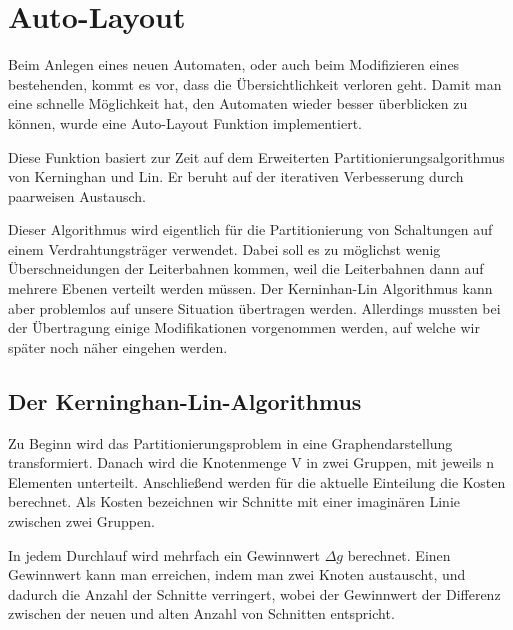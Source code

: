 



\chapter{Auto-Layout}\label{AutoLayout}

Beim Anlegen eines neuen Automaten, oder auch beim Modifizieren eines
bestehenden, kommt es vor, dass die Übersichtlichkeit verloren geht. Damit man
eine schnelle Möglichkeit hat, den Automaten wieder besser überblicken zu
können, wurde eine Auto-Layout Funktion implementiert.\vspace{10pt}

Diese Funktion basiert zur Zeit auf dem Erweiterten Partitionierungsalgorithmus
von Kerninghan und Lin. Er beruht auf der iterativen Verbesserung durch
paarweisen Austausch.\vspace{10pt}

Dieser Algorithmus wird eigentlich für die Partitionierung von Schaltungen auf
einem Verdrahtungsträger verwendet. Dabei soll es zu möglichst wenig
Überschneidungen der Leiterbahnen kommen, weil die Leiterbahnen dann auf mehrere
Ebenen verteilt werden müssen. Der Kerninhan-Lin Algorithmus kann aber problemlos
auf unsere Situation übertragen werden. Allerdings mussten bei der Übertragung
einige Modifikationen vorgenommen werden, auf welche wir später noch näher
eingehen werden.\vspace{10pt}

\section{Der Kerninghan-Lin-Algorithmus}\label{KerninghanLin}

Zu Beginn wird das Partitionierungsproblem in eine Graphendarstellung
transformiert. Danach wird die Knotenmenge V in zwei Gruppen, mit jeweils n
Elementen unterteilt. Anschließend werden für die aktuelle Einteilung die Kosten
berechnet. Als Kosten bezeichnen wir Schnitte mit einer imaginären Linie
zwischen zwei Gruppen.\vspace{10pt}

In jedem Durchlauf wird mehrfach ein Gewinnwert $\Delta g$ berechnet. Einen
Gewinnwert kann man erreichen, indem man zwei Knoten austauscht, und dadurch
die Anzahl der Schnitte verringert, wobei der Gewinnwert der Differenz
zwischen der neuen und alten Anzahl von Schnitten entspricht.

